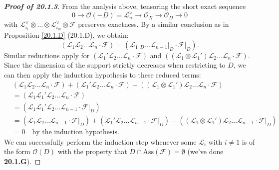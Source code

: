 \begin{proof}[\textbf{Proof of 20.1.3}]
From the analysis above, tensoring the short exact sequence
\[
0 \longrightarrow \mathcal{O}(-D) = \mathcal{L}_n^\vee \longrightarrow \mathcal{O}_X \longrightarrow \mathcal{O}_D \longrightarrow 0
\]
with $\mathcal{L}_{i_1}^\vee \otimes \dots \otimes \mathcal{L}_{i_m}^\vee \otimes \mathcal{F}$ preserves exactness. 
By a similar conclusion as in Proposition \ref{20.1.D} (20.1.D), we obtain:
\[
(\mathcal{L}_1 \mathcal{L}_2 \dots \mathcal{L}_n \cdot \mathcal{F}) = (\mathcal{L}_1|_D \dots \mathcal{L}_{n-1}|_D \cdot \mathcal{F}|_D).
\]
Similar reductions apply for $(\mathcal{L}_1' \mathcal{L}_2 \dots \mathcal{L}_n \cdot \mathcal{F})$ and $((\mathcal{L}_1 \otimes \mathcal{L}_1') \mathcal{L}_2 \dots \mathcal{L}_n \cdot \mathcal{F})$. 
Since the dimension of the support strictly decreases when restricting to $D$, we can then apply the induction hypothesis to these reduced terms:
\begin{align*}
    &(\mathcal{L}_1 \mathcal{L}_2 \dots \mathcal{L}_n \cdot \mathcal{F}) + (\mathcal{L}_1' \mathcal{L}_2 \dots \mathcal{L}_n \cdot \mathcal{F}) - ((\mathcal{L}_1 \otimes \mathcal{L}_1') \mathcal{L}_2 \dots \mathcal{L}_n \cdot \mathcal{F})\\
    &= (\mathcal{L}_1 \mathcal{L}_1' \mathcal{L}_2 \dots \mathcal{L}_n \cdot \mathcal{F})\\
    &= (\mathcal{L}_1 \mathcal{L}_1' \mathcal{L}_2 \dots \mathcal{L}_{n-1} \cdot \mathcal{F}|_D)\\
    &= (\mathcal{L}_1 \mathcal{L}_2 \dots \mathcal{L}_{n-1} \cdot \mathcal{F}|_D) + (\mathcal{L}_1' \mathcal{L}_2 \dots \mathcal{L}_{n-1} \cdot \mathcal{F}|_D) - ((\mathcal{L}_1 \otimes \mathcal{L}_1') \mathcal{L}_2 \dots \mathcal{L}_{n-1} \cdot \mathcal{F}|_D)\\
    &= 0 \quad \text{by the induction hypothesis.}
\end{align*}
We can successfully perform the induction step whenever some $\mathcal{L}_i$ with $i\neq 1$ is of the form $\mathcal{O}(D)$ with the property that $D \cap \text{Ass}(\mathcal{F}) = \emptyset$ (we've done \textbf{20.1.G}).


\end{proof}
